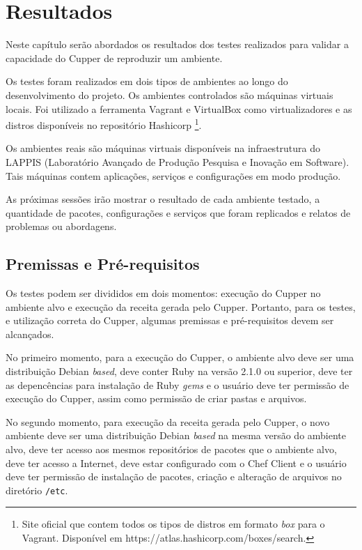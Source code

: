 \newpage\null\thispagestyle{empty}\newpage
\chapter{Resultados}
\label{chap:result}

Neste capítulo serão abordados os resultados dos testes realizados
para validar a capacidade do Cupper de reproduzir um ambiente.

Os testes foram realizados em dois tipos de ambientes ao longo do
desenvolvimento do projeto. Os ambientes controlados são máquinas
virtuais locais. Foi utilizado a ferramenta Vagrant e VirtualBox
como virtualizadores e as distros disponíveis no repositório Hashicorp
\footnote{Site oficial que contem todos os tipos de distros em formato \textit{box} para o Vagrant. Disponível em https://atlas.hashicorp.com/boxes/search.}.

Os ambientes reais são máquinas virtuais disponíveis na infraestrutura
do LAPPIS (Laboratório Avançado de Produção Pesquisa e Inovação em Software).
Tais máquinas contem aplicações, serviços e configurações em modo produção.

As próximas sessões irão mostrar o resultado de cada ambiente testado,
a quantidade de pacotes, configurações e serviços que foram replicados
e relatos de problemas ou abordagens.

\section{Premissas e Pré-requisitos}

Os testes podem ser divididos em dois momentos: execução do Cupper no
ambiente alvo e execução da receita gerada pelo Cupper. Portanto,
para os testes, e utilização correta do Cupper, algumas premissas
e pré-requisitos devem ser alcançados.

No primeiro momento, para a execução do Cupper, o ambiente alvo deve
ser uma distribuição Debian \textit{based}, deve conter Ruby na versão
2.1.0 ou superior, deve ter as depencências para instalação
de Ruby \textit{gems} e o usuário deve ter permissão de execução do Cupper, assim como
permissão de criar pastas e arquivos.

No segundo momento, para execução da receita gerada pelo Cupper, o novo
ambiente deve ser uma distribuição Debian \textit{based} na mesma versão do ambiente
alvo, deve ter acesso aos mesmos repositórios de pacotes que
o ambiente alvo, deve ter acesso a Internet, deve estar configurado com o Chef Client e
o usuário deve ter permissão de instalação de pacotes, criação e alteração de arquivos no
diretório \texttt{/etc}.

